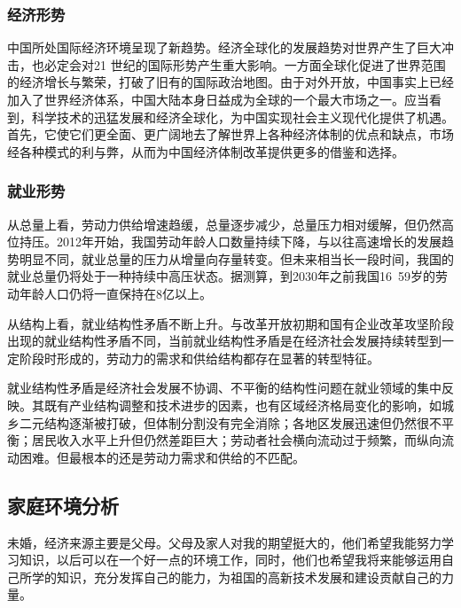 \documentclass{article}
\begin{document}
\subsubsection{经济形势}
中国所处国际经济环境呈现了新趋势。经济全球化的发展趋势对世界产生了巨大冲击，也必定会对21 世纪的国际形势产生重大影响。一方面全球化促进了世界范围的经济增长与繁荣，打破了旧有的国际政治地图。由于对外开放，中国事实上已经加入了世界经济体系，中国大陆本身日益成为全球的一个最大市场之一。应当看到，科学技术的迅猛发展和经济全球化，为中国实现社会主义现代化提供了机遇。首先，它使它们更全面、更广阔地去了解世界上各种经济体制的优点和缺点，市场经各种模式的利与弊，从而为中国经济体制改革提供更多的借鉴和选择。\par
\subsubsection{就业形势}
从总量上看，劳动力供给增速趋缓，总量逐步减少，总量压力相对缓解，但仍然高位持压。2012年开始，我国劳动年龄人口数量持续下降，与以往高速增长的发展趋势明显不同，就业总量的压力从增量向存量转变。但未来相当长一段时间，我国的就业总量仍将处于一种持续中高压状态。据测算，到2030年之前我国16~59岁的劳动年龄人口仍将一直保持在8亿以上。\par
从结构上看，就业结构性矛盾不断上升。与改革开放初期和国有企业改革攻坚阶段出现的就业结构性矛盾不同，当前就业结构性矛盾是在经济社会发展持续转型到一定阶段时形成的，劳动力的需求和供给结构都存在显著的转型特征。\par
就业结构性矛盾是经济社会发展不协调、不平衡的结构性问题在就业领域的集中反映。其既有产业结构调整和技术进步的因素，也有区域经济格局变化的影响，如城乡二元结构逐渐被打破，但体制分割没有完全消除；各地区发展迅速但仍然很不平衡；居民收入水平上升但仍然差距巨大；劳动者社会横向流动过于频繁，而纵向流动困难。但最根本的还是劳动力需求和供给的不匹配。\par
\subsection{家庭环境分析}
未婚，经济来源主要是父母。父母及家人对我的期望挺大的，他们希望我能努力学习知识，以后可以在一个好一点的环境工作，同时，他们也希望我将来能够运用自己所学的知识，充分发挥自己的能力，为祖国的高新技术发展和建设贡献自己的力量。
\end{document}
